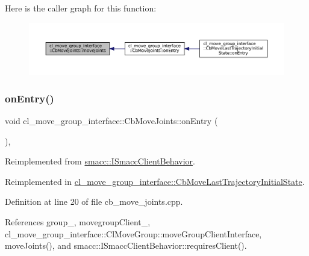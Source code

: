 Here is the caller graph for this function\+:
\nopagebreak
\begin{figure}[H]
\begin{center}
\leavevmode
\includegraphics[width=350pt]{classcl__move__group__interface_1_1CbMoveJoints_ad91d243eb8a818e240d85e5a7fdea68d_icgraph}
\end{center}
\end{figure}
\mbox{\label{classcl__move__group__interface_1_1CbMoveJoints_a23e4181af695aed9fa6bb4ae3f17fd76}} 
\subsubsection{\texorpdfstring{on\+Entry()}{onEntry()}}
{\footnotesize\ttfamily void cl\+\_\+move\+\_\+group\+\_\+interface\+::\+Cb\+Move\+Joints\+::on\+Entry (\begin{DoxyParamCaption}{ }\end{DoxyParamCaption})\hspace{0.3cm}{\ttfamily [override]}, {\ttfamily [virtual]}}



Reimplemented from \hyperlink{classsmacc_1_1ISmaccClientBehavior_a9877684b1954429719826e2d0924d980}{smacc\+::\+I\+Smacc\+Client\+Behavior}.



Reimplemented in \hyperlink{classcl__move__group__interface_1_1CbMoveLastTrajectoryInitialState_ad51f4883ea1f7442875cda06c3d474c3}{cl\+\_\+move\+\_\+group\+\_\+interface\+::\+Cb\+Move\+Last\+Trajectory\+Initial\+State}.



Definition at line 20 of file cb\+\_\+move\+\_\+joints.\+cpp.



References group\+\_\+, movegroup\+Client\+\_\+, cl\+\_\+move\+\_\+group\+\_\+interface\+::\+Cl\+Move\+Group\+::move\+Group\+Client\+Interface, move\+Joints(), and smacc\+::\+I\+Smacc\+Client\+Behavior\+::requires\+Client().



